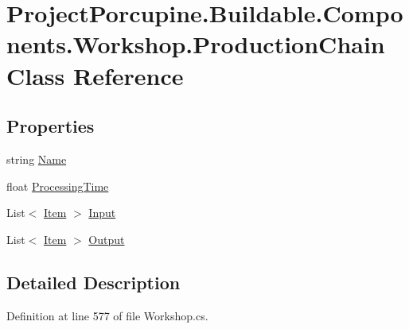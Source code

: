 \hypertarget{class_project_porcupine_1_1_buildable_1_1_components_1_1_workshop_1_1_production_chain}{}\section{Project\+Porcupine.\+Buildable.\+Components.\+Workshop.\+Production\+Chain Class Reference}
\label{class_project_porcupine_1_1_buildable_1_1_components_1_1_workshop_1_1_production_chain}
\subsection*{Properties}
\begin{DoxyCompactItemize}
\item 
string \hyperlink{class_project_porcupine_1_1_buildable_1_1_components_1_1_workshop_1_1_production_chain_a9aeea7672e432c0e6934cf9c8d150fa5}{Name}
\item 
float \hyperlink{class_project_porcupine_1_1_buildable_1_1_components_1_1_workshop_1_1_production_chain_a11dba3626a147ce7e834738f88cd3f9d}{Processing\+Time}
\item 
List$<$ \hyperlink{class_project_porcupine_1_1_buildable_1_1_components_1_1_workshop_1_1_item}{Item} $>$ \hyperlink{class_project_porcupine_1_1_buildable_1_1_components_1_1_workshop_1_1_production_chain_abed584e508ac2a2ad1112bf8371cecf0}{Input}
\item 
List$<$ \hyperlink{class_project_porcupine_1_1_buildable_1_1_components_1_1_workshop_1_1_item}{Item} $>$ \hyperlink{class_project_porcupine_1_1_buildable_1_1_components_1_1_workshop_1_1_production_chain_a87404e2705a9247b289f284b8b0826e3}{Output}
\end{DoxyCompactItemize}


\subsection{Detailed Description}


Definition at line 577 of file Workshop.\+cs.



